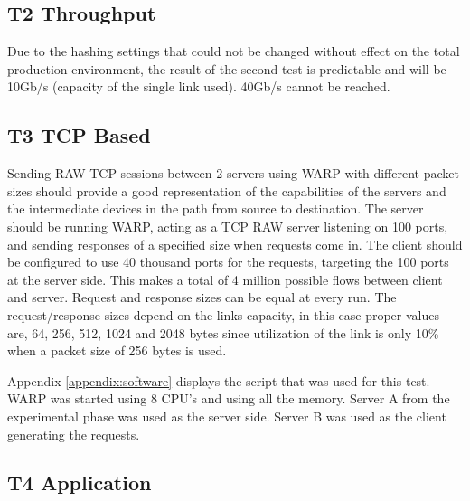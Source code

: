 \subsection{T2 Throughput}
Due to the hashing settings that could not be changed without effect on the total production environment, the result of the second test is predictable and will be 10Gb/s (capacity of the single link used). 40Gb/s cannot be reached.

\subsection{T3 TCP Based}
Sending RAW TCP sessions between 2 servers using WARP with different packet sizes should provide a good representation of the capabilities of the servers and the intermediate devices in the path from source to destination. 
The server should be running WARP, acting as a TCP RAW server listening on 100 ports, and sending responses of a specified size when requests come in. The client should be configured to use 40 thousand ports for the requests, targeting the 100 ports at the server side. This makes a total of 4 million possible flows between client and server. Request and response sizes can be equal at every run. The request/response sizes depend on the links capacity, in this case proper values are, 64, 256, 512, 1024 and 2048 bytes since utilization of the link is only 10\% when a packet size of 256 bytes is used.  

Appendix \ref{appendix:software} displays the script that was used for this test. WARP was started using 8 CPU's and using all the memory. 
Server A from the experimental phase was used as the server side. Server B was used as the client generating the requests.

\subsection{T4 Application}

